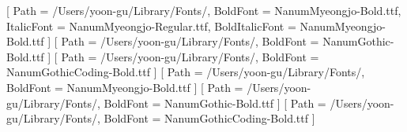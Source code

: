 \usepackage[
  paperwidth=180mm,
  paperheight=260mm,
  top=24mm,bottom=24mm,
  inner=22mm,outer=18mm,
  headheight=24pt
]{geometry}
\usepackage{kotex}
\usepackage{fontspec}
\usepackage{xcolor}
\usepackage{graphicx}
\usepackage{tikz}
\usepackage{amsmath,amssymb}
\usepackage{sansmath}
\usepackage{booktabs,longtable,array}
\usepackage{tabularx}
\usepackage{xltabular}
\usepackage{adjustbox}
\usepackage{caption}
\usepackage{float}
\usepackage{hyperref}
\usepackage{fancyhdr}
\usepackage[most]{tcolorbox}
\usepackage{listings}
\usepackage{makeidx}
\usepackage{titlesec}
\usepackage{tocloft}
\usepackage{enumitem}
\usepackage{etoolbox}
\usepackage{setspace}
\usepackage{needspace}
\providecommand{\booktheme}{slate}
\usepackage{themes/\booktheme}
\usepackage{designsystem}

\makeindex
\setlength{\cftchapnumwidth}{2.8em}
\setlength{\cftsecnumwidth}{4.2em}
\setlength{\cftsubsecnumwidth}{5.0em}

\setmainfont{NanumMyeongjo-Regular.ttf}[
  Path = /Users/yoon-gu/Library/Fonts/,
  BoldFont = NanumMyeongjo-Bold.ttf,
  ItalicFont = NanumMyeongjo-Regular.ttf,
  BoldItalicFont = NanumMyeongjo-Bold.ttf
]
\setsansfont{NanumGothic-Regular.ttf}[
  Path = /Users/yoon-gu/Library/Fonts/,
  BoldFont = NanumGothic-Bold.ttf
]
\setmonofont{NanumGothicCoding-Regular.ttf}[
  Path = /Users/yoon-gu/Library/Fonts/,
  BoldFont = NanumGothicCoding-Bold.ttf
]
[
  Path = /Users/yoon-gu/Library/Fonts/,
  BoldFont = NanumMyeongjo-Bold.ttf
]
[
  Path = /Users/yoon-gu/Library/Fonts/,
  BoldFont = NanumGothic-Bold.ttf
]
[
  Path = /Users/yoon-gu/Library/Fonts/,
  BoldFont = NanumGothicCoding-Bold.ttf
]
\AtBeginDocument{\sansmath}

\pagestyle{fancy}
\fancyhf{}
\fancyhead[LE,RO]{\sffamily\small\thepage}
\fancyhead[LO]{\sffamily\small\nouppercase{\rightmark}}
\fancyhead[RE]{\sffamily\small\nouppercase{\leftmark}}
\renewcommand{\headrulewidth}{0.3pt}
\renewcommand{\headrule}{\hbox to\headwidth{\color{taInk}\leaders\hrule height \headrulewidth\hfill}}
\renewcommand{\footrulewidth}{0pt}


